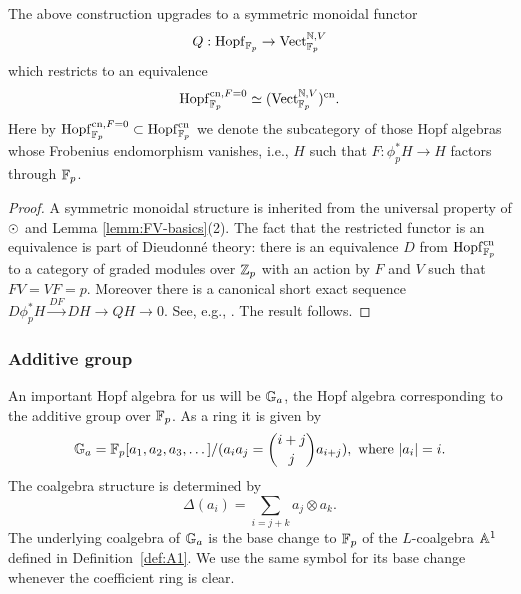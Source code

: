 \begin{proposition} \label{prop:indecomp-charp}
The above construction upgrades to a symmetric monoidal functor \[ Q: \mathrm{Hopf}_{\mathbb{F}_p} \to \mathrm{Vect}_{\mathbb{F}_p}^{\mathbb{N},V} \] which restricts to an equivalence \[ \mathrm{Hopf}_{\mathbb{F}_p}^{\mathrm{cn},F=0} \simeq (\mathrm{Vect}_{\mathbb{F}_p}^{\mathbb{N},V})^{\mathrm{cn}}. \]
Here by $\mathrm{Hopf}_{\mathbb{F}_p}^{\mathrm{cn},F=0} \subset \mathrm{Hopf}_{\mathbb{F}_p}^{\mathrm{cn}}$ we denote the subcategory of those Hopf algebras whose Frobenius endomorphism vanishes, i.e., $H$ such that $F: \phi_p^* H \to H$ factors through $\mathbb{F}_p$.
\end{proposition}
\begin{proof}
A symmetric monoidal structure is inherited from the universal property of $\odot$ and Lemma \ref{lemm:FV-basics}(2).
The fact that the restricted functor is an equivalence is part of Dieudonné theory: there is an equivalence $D$ from $\mathrm{Hopf}_{\mathbb{F}_p}^{\mathrm{cn}}$ to a category of graded modules over $\mathbb{Z}_p$ with an action by $F$ and $V$ such that $FV = VF = p$.
Moreover there is a canonical short exact sequence $D\phi_p^* H \xrightarrow{DF} DH \to QH \to 0$.
See, e.g., \cite[Theorem 4.7, Lemma 4.4]{goerss-dieudonne}.
The result follows.
\end{proof}

\subsubsection{Additive group} \label{subsec:Ga}
An important Hopf algebra for us will be ${\mathbb G}_a$, the Hopf algebra corresponding to the additive group over $\mathbb{F}_p$.
As a ring it is given by \[ {\mathbb G}_a = \mathbb{F}_p[a_1, a_2, a_3, \dots]/(a_i a_j = {i+j \choose j} a_{i+j}), \text{ where } |a_i| = i. \]
The coalgebra structure is determined by \[ \Delta(a_i) = \sum_{i = j + k} a_j \otimes a_k. \]
The underlying coalgebra of ${\mathbb G}_a$ is the base change to $\mathbb{F}_p$ of the $L$-coalgebra $\mathbb A^1$ defined in Definition~\ref{def:A1}. We use the same symbol for its base change whenever the coefficient ring is clear.

